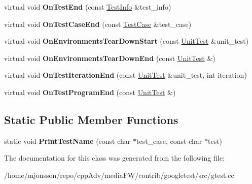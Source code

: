 \begin{DoxyCompactItemize}
\item 
\mbox{\label{classtesting_1_1internal_1_1PrettyUnitTestResultPrinter_a06749ff2b32a16c127374ecd015f13e0}} 
virtual void {\bfseries On\+Test\+End} (const \hyperlink{classtesting_1_1TestInfo}{Test\+Info} \&test\+\_\+info)
\item 
\mbox{\label{classtesting_1_1internal_1_1PrettyUnitTestResultPrinter_a7a62fe58fa6f6aace813eb62b31e5a51}} 
virtual void {\bfseries On\+Test\+Case\+End} (const \hyperlink{classtesting_1_1TestCase}{Test\+Case} \&test\+\_\+case)
\item 
\mbox{\label{classtesting_1_1internal_1_1PrettyUnitTestResultPrinter_afea9dc849c92fdbc1d8505f4c74ffc1a}} 
virtual void {\bfseries On\+Environments\+Tear\+Down\+Start} (const \hyperlink{classtesting_1_1UnitTest}{Unit\+Test} \&unit\+\_\+test)
\item 
\mbox{\label{classtesting_1_1internal_1_1PrettyUnitTestResultPrinter_ab23094ef3b714778b2f742d39818c280}} 
virtual void {\bfseries On\+Environments\+Tear\+Down\+End} (const \hyperlink{classtesting_1_1UnitTest}{Unit\+Test} \&)
\item 
\mbox{\label{classtesting_1_1internal_1_1PrettyUnitTestResultPrinter_ac29b30216023baddda04ef5889f484ff}} 
virtual void {\bfseries On\+Test\+Iteration\+End} (const \hyperlink{classtesting_1_1UnitTest}{Unit\+Test} \&unit\+\_\+test, int iteration)
\item 
\mbox{\label{classtesting_1_1internal_1_1PrettyUnitTestResultPrinter_a8c92c062889abdb940b04ffe113f5980}} 
virtual void {\bfseries On\+Test\+Program\+End} (const \hyperlink{classtesting_1_1UnitTest}{Unit\+Test} \&)
\end{DoxyCompactItemize}
\subsection*{Static Public Member Functions}
\begin{DoxyCompactItemize}
\item 
\mbox{\label{classtesting_1_1internal_1_1PrettyUnitTestResultPrinter_a5b60a9aed1db02837b11450f6e8d0f71}} 
static void {\bfseries Print\+Test\+Name} (const char $\ast$test\+\_\+case, const char $\ast$test)
\end{DoxyCompactItemize}


The documentation for this class was generated from the following file\+:\begin{DoxyCompactItemize}
\item 
/home/mjonsson/repo/cpp\+Adv/media\+F\+W/contrib/googletest/src/gtest.\+cc\end{DoxyCompactItemize}
